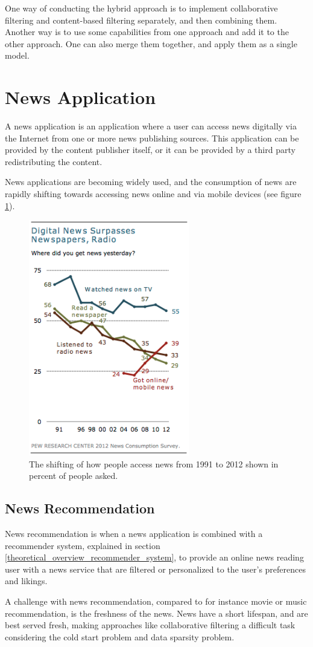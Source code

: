 One way of conducting the hybrid approach is to implement collaborative filtering and content-based filtering separately, and then combining them. Another way is to use some capabilities from one approach and add it to the other approach. One can also merge them together, and apply them as a single model.

\section{News Application}
A news application is an application where a user can access news digitally via the Internet from one or more news publishing sources. This application can be provided by the content publisher itself, or it can be provided by a third party redistributing the content.

News applications are becoming widely used, and the consumption of news are rapidly shifting towards accessing news online and via mobile devices (see figure \ref{pew_news_consumption_survey}).

\begin{figure}[!htbp]
\centering
\includegraphics[width=70mm]{GFX/tech/pewNewsConsumptionSurvey.png}
\caption{The shifting of how people access news from 1991 to 2012 shown in percent of people asked.}
\label{pew_news_consumption_survey}
\end{figure}

\subsection{News Recommendation}
News recommendation is when a news application is combined with a recommender system, explained in section \ref{theoretical_overview_recommender_system}, to provide an online news reading user with a news service that are filtered or personalized to the user's preferences and likings.

A challenge with news recommendation, compared to for instance movie or music recommendation, is the freshness of the news. News have a short lifespan, and are best served fresh, making approaches like collaborative filtering a difficult task considering the cold start problem and data sparsity problem.



